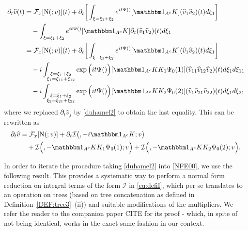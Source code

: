 \documentclass[a4paper,
11pt,  reqno]{amsart}
\makeatletter
\newcommand{\5}{\textup{V}}
\newcommand{\ft}{\widehat}
\newcommand{\ind}{\mathbbm 1}
\newcommand{\dt}{\partial_t}
\theoremstyle{remark}
\newcommand{\Ft}{{\mathcal{F}}}
\def\<#1>{\csname MH@symb@#1\endcsname}
\newcommand{\Ical}{\mathcal{I}}
\numberwithin{equation}{section}
\numberwithin{theorem}{section}
\newcommand{\NN}{\mathrm{N}}
\makeatother
\begin{document}
\begin{align}
\label{NFE01}
\begin{split}
\dt\ft v(t)  
&=
\Ft_x[ \NN ( \<1>; v )] (t)
+ \dt\bigg[ \int_{\xi = \xi_1 + \xi_2} e^{it \Psi(\<1>)} 
[\ind_{A^c}
 K ] 
(\ft v_{1} \ft v_{2} )(t)
d\xi_{1} 
\bigg]
\\
&
\quad 
-
   \int_{\xi = \xi_1 + \xi_2} e^{it \Psi(\<1>)} 
[ \ind_{A^c} K ]
\partial_{t} (\ft v_{1} \ft v_{2} )(t)
d\xi_{1} 
\\
& =
\Ft_x[ \NN ( \<1>; v )] (t)
+  \dt\bigg[ \int_{\xi = \xi_1 + \xi_2} e^{it \Psi(\<1>)} 
[\ind_{A^c}
 K ] 
(\ft v_{1} \ft v_{2} )(t)
d\xi_{1} 
\bigg]
\\
&
\quad 
- i
 \int_{\substack{\xi = \xi_1 + \xi_2 \\ \xi_1 = \xi_{11}+ \xi_{12}  }} \exp\Big(it \Psi(\<21>) \Big)
[ \ind_{A^c} K K_1 \Psi_0(1) ]
 (\ft v_{11} \ft v_{12} \ft v_2 )(t)
d\xi_{1} d\xi_{11} 
\\
&
\quad 
-i  \int_{\substack{\xi = \xi_1 + \xi_2 \\ \xi_2 = \xi_{21}+ \xi_{22}  }} \exp\Big(it \Psi(\<22>) \Big)
[ \ind_{A^c} K K_2 \Psi_0(2) ]
 (\ft v_{1} \ft v_{21} \ft v_{22} )(t)
d\xi_{1} d\xi_{21}
\end{split}
\end{align}
where we replaced $\dt \ft v_j$ by \eqref{duhamel2} to obtain the last equality. This can be rewritten as
\begin{align}
\label{NFE00}
\begin{split}
\dt\ft v 
&
=
 \Ft_x[ \NN ( \<1>; v )] 
+ 
\dt\Ical \big( \<1>,  - i \ind_{A^c} K; v \big) 
\\
&
\quad 
+
\Ical \Big( \<21>, - \ind_{A^c} KK_1\Psi_0(1) ; v  \Big) 
+
\Ical \Big( \<22>, - \ind_{A^c} KK_2\Psi_0(2) ; v  \Big) 
. 
\end{split}
\end{align}






In order to iterate the procedure taking \eqref{duhamel2} into \eqref{NFE00}, we use the following result. This provides a systematic way to perform a normal form reduction on integral terms of the form $\Ical$ in \eqref{eq:defiI}, which per se translates to an operation on trees (based on tree concatenation as defined in Definition~\ref{DEF:tree3}~(ii)) and suitable modifications of the multipliers. We refer the reader to the companion paper CITE for its proof - which, in spite of not being identical, works in the exact same fashion in our context. 
\end{document}
